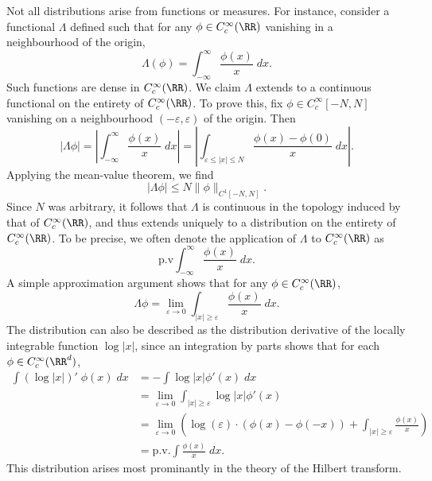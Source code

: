 \begin{example}
    Not all distributions arise from functions or measures. For instance, consider a functional $\Lambda$ defined such that for any $\phi \in C_c^\infty(\RR)$ vanishing in a neighbourhood of the origin,
    \[ \Lambda(\phi) = \int_{-\infty}^\infty \frac{\phi(x)}{x}\; dx. \]
    Such functions are dense in $C_c^\infty(\RR)$. We claim $\Lambda$ extends to a continuous functional on the entirety of $C_c^\infty(\RR)$. To prove this, fix $\phi \in C_c^\infty[-N,N]$ vanishing on a neighbourhood $(-\varepsilon,\varepsilon)$ of the origin. Then
    \[ |\Lambda \phi| = \left| \int_{-\infty}^\infty \frac{\phi(x)}{x}\; dx \right| = \left| \int_{\varepsilon \leq |x| \leq N} \frac{\phi(x) - \phi(0)}{x}\; dx \right|. \]
    Applying the mean-value theorem, we find
    \[ |\Lambda \phi| \leq N \| \phi \|_{C^1[-N,N]}. \]
    Since $N$ was arbitrary, it follows that $\Lambda$ is continuous in the topology induced by that of $C_c^\infty(\RR)$, and thus extends uniquely to a distribution on the entirety of $C_c^\infty(\RR)$. To be precise, we often denote the application of $\Lambda$ to $C_c^\infty(\RR)$ as
    \[ \text{p.v} \int_{-\infty}^\infty \frac{\phi(x)}{x}\; dx. \]
    A simple approximation argument shows that for any $\phi \in C_c^\infty(\RR)$,
    \[ \Lambda \phi = \lim_{\varepsilon \to 0} \int_{|x| \geq \varepsilon} \frac{\phi(x)}{x}\; dx. \]
    The distribution can also be described as the distribution derivative of the locally integrable function $\log |x|$, since an integration by parts shows that for each $\phi \in C_c^\infty(\RR^d)$,
    \begin{align*}
        \int (\log |x|)'\; \phi(x)\; dx &= - \int \log |x| \phi'(x)\; dx\\
        &= \lim_{\varepsilon \to 0} \int_{|x| \geq \varepsilon} \log |x| \phi'(x)\\
        &= \lim_{\varepsilon \to 0} \left( \log(\varepsilon) \cdot \left( \phi(x) - \phi(-x) \right) + \int_{|x| \geq \varepsilon} \frac{\phi(x)}{x} \right)\\
        &= \text{p.v.} \int \frac{\phi(x)}{x}\; dx.
    \end{align*}
    This distribution arises most prominantly in the theory of the Hilbert transform.
\end{example}

